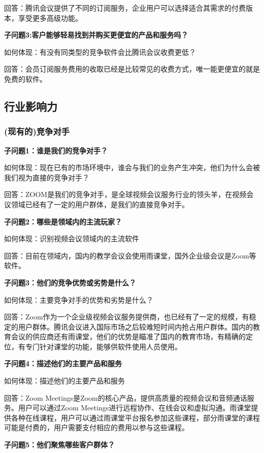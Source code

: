 \documentclass[a4paper,12pt]{article}
\begin{document}
    回答：腾讯会议提供了不同的订阅服务，企业用户可以选择适合其需求的付费版本，享受更多高级功能。
    
    \textbf{子问题3:客户能够轻易找到并购买更便宜的产品和服务吗？}

    如何体现：有没有同类型的竞争软件会⽐腾讯会议收费更低？

    回答：会员订阅服务费用的收取已经是⽐较常⻅的收费⽅式，唯⼀能更便宜的就是免费的软件。
    
    \subsection{行业影响力}
    \subsubsection{(现有的)竞争对手}
    \textbf{子问题1：谁是我们的竞争对手？}

    如何体现：现在已有的市场环境中，谁会与我们的业务产⽣冲突，他们为什么会被我们视为直接的竞争对⼿？

    回答：ZOOM是我们的竞争对⼿，是全球视频会议服务⾏业的领头⽺，在视频会议领域已经有了⼀定的⽤户群体，是我们的直接竞争对⼿。
    

    \textbf{子问题2：哪些是领域内的主流玩家？}

    如何体现：识别视频会议领域内的主流软件

    回答：⽬前在领域内，国内的教学会议会使⽤⾬课堂，国外企业级会议是Zoom等软件。

    \textbf{子问题3：他们的竞争优势或劣势是什么？}

    如何体现：主要竞争对⼿的优势和劣势是什么？

    回答：Zoom作为⼀个企业级视频会议服务提供商，也已经有了⼀定的规模，有稳定的⽤户群体。腾讯会议进⼊国际市场之后较难短时间内抢占⽤户群体。国内的教育会议的供应商还有⾬课堂，他们的优势是瞄准了国内的教育市场，有精确的定位，有专⻔针对课堂的功能，能够供软件使⽤⼈员使⽤。

    \textbf{子问题4：描述他们的主要产品和服务}

    如何体现：描述他们的主要产品和服务

    回答：Zoom Meetings是Zoom的核心产品，提供高质量的视频会议和音频通话服务。用户可以通过Zoom Meetings进行远程协作、在线会议和虚拟沟通。雨课堂提供各种在线课程，用户可以通过雨课堂平台报名参加这些课程，部分雨课堂的课程可能是付费的，用户需要支付相应的费用以参与这些课程。

    \textbf{子问题5：他们聚焦哪些客户群体？}
\end{document}
